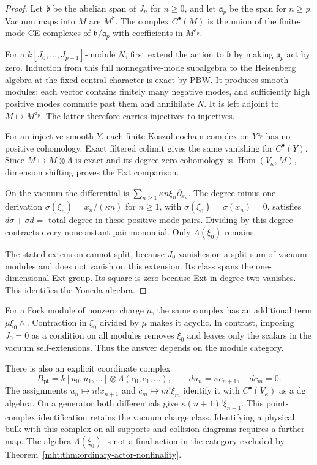 \begin{proof}
Let $\mathfrak b$ be the abelian span of $J_n$
for $n\geq0$, and let $\mathfrak a_p$ be the
span for $n\geq p$. Vacuum maps into $M$ are
$M^{\mathfrak b}$. The complex $C^\bullet(M)$
is the union of the finite-mode CE complexes
of $\mathfrak b/\mathfrak a_p$ with coefficients
in $M^{\mathfrak a_p}$.

For a $k[J_0,\ldots,J_{p-1}]$-module $N$, first extend
the action to $\mathfrak b$ by making $\mathfrak a_p$ act
by zero. Induction from this full nonnegative-mode
subalgebra to the Heisenberg algebra at the fixed central
character is exact by PBW. It produces smooth modules:
each vector contains finitely many negative modes, and
sufficiently high positive modes commute past them and
annihilate $N$.
It is left adjoint to $M\mapsto M^{\mathfrak a_p}$.
The latter therefore carries injectives to
injectives. 

For an injective smooth $Y$, each
finite Koszul cochain complex on
$Y^{\mathfrak a_p}$ has no positive cohomology.
Exact filtered colimit gives the same vanishing
for $C^\bullet(Y)$. Since $M\mapsto M\otimes\Lambda$
is exact and its degree-zero cohomology is
$\operatorname{Hom}(V_\kappa,M)$, dimension shifting
proves the Ext comparison.

On the vacuum the differential is
$\sum_{n\geq1}\kappa n\xi_n\partial_{x_n}$.
The degree-minus-one derivation
$\sigma(\xi_n)=x_n/(\kappa n)$ for $n\geq1$,
with $\sigma(\xi_0)=\sigma(x_n)=0$, satisfies
$d\sigma+\sigma d=$ total degree in these
positive-mode pairs. Dividing by this degree
contracts every nonconstant pair monomial.
Only $\Lambda(\xi_0)$ remains.

The stated extension cannot split, because
$J_0$ vanishes on a split sum of vacuum modules
and does not vanish on this extension. Its
class spans the one-dimensional Ext group.
Its square is zero because Ext in degree two
vanishes. This identifies the Yoneda algebra.
\end{proof}

For a Fock module of nonzero charge $\mu$, the
same complex has an additional term
$\mu\xi_0\wedge$. Contraction in $\xi_0$
divided by $\mu$ makes it acyclic. In contrast,
imposing $J_0=0$ as a condition on all modules
removes $\xi_0$ and leaves only the scalars in
the vacuum self-extensions. Thus the answer
depends on the module category.

There is also an explicit coordinate complex
\[
 B_{\mathrm{pt}}=k[u_0,u_1,\ldots]
       \otimes\Lambda(c_0,c_1,\ldots),
 \qquad du_n=\kappa c_{n+1},\quad dc_m=0.
\]
The assignments
$u_n\mapsto n!x_{n+1}$ and
$c_m\mapsto m!\xi_m$ identify it with
$C^\bullet(V_\kappa)$ as a dg algebra. On a
generator both differentials give
$\kappa(n+1)!\xi_{n+1}$.
This point-complex identification retains the
vacuum charge class. Identifying a physical
bulk with this complex on all supports and
collision diagrams requires a further map.
The algebra $\Lambda(\xi_0)$ is not a final
action in the category excluded by
Theorem~\ref{mht:thm:ordinary-actor-nonfinality}.

